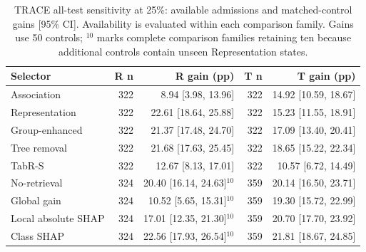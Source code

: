 \begin{table}[!tbp]\centering\scriptsize
\caption{TRACE all-test sensitivity at 25\%: available admissions and matched-control gains [95\% CI]. Availability is evaluated within each comparison family. Gains use 50 controls; $^{10}$ marks complete comparison families retaining ten because additional controls contain unseen Representation states.}\label{tab:trace-rq1-all}
\begin{tabular}{lrrrr}\toprule
Selector & R n & R gain (pp) & T n & T gain (pp) \\ \midrule
Association & 322 & 8.94 [3.98, 13.96] & 322 & 14.92 [10.59, 18.67] \\
Representation & 322 & 22.61 [18.64, 25.88] & 322 & 15.23 [11.55, 18.91] \\
Group-enhanced & 322 & 21.37 [17.48, 24.70] & 322 & 17.09 [13.40, 20.41] \\
Tree removal & 322 & 21.68 [17.63, 25.45] & 322 & 18.65 [15.22, 22.34] \\
TabR-S & 322 & 12.67 [8.13, 17.01] & 322 & 10.57 [6.72, 14.49] \\
No-retrieval & 324 & 20.40 [16.14, 24.63]$^{10}$ & 359 & 20.14 [16.50, 23.71] \\
Global gain & 324 & 10.52 [5.65, 15.31]$^{10}$ & 359 & 19.30 [15.72, 22.99] \\
Local absolute SHAP & 324 & 17.01 [12.35, 21.30]$^{10}$ & 359 & 20.70 [17.70, 23.92] \\
Class SHAP & 324 & 22.56 [17.93, 26.54]$^{10}$ & 359 & 21.81 [18.67, 24.85] \\
\bottomrule\end{tabular}
\end{table}
